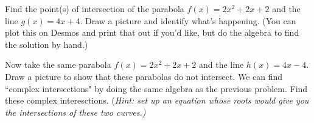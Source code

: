 \documentclass[12pt]{article} %
\begin{document}
\begin{problem}
    Find the point(s) of intersection of the parabola $f(x)=2x^2+2x+2$ and the line $g(x)=4x+4$. Draw a picture and identify what's happening. (You can plot this on Desmos and print that out if you'd like, but do the algebra to find the solution by hand.)
\end{problem}

\begin{problem}
    Now take the same parabola $f(x)=2x^2+2x+2$ and the line $h(x)=4x-4$. Draw a picture to show that these parabolas do not intersect. We can find ``complex intersections" by doing the same algebra as the previous problem. Find these complex interesctions. (\emph{Hint: set up an equation whose roots would give you the intersections of these two curves.)}
\end{problem}
\end{document}
